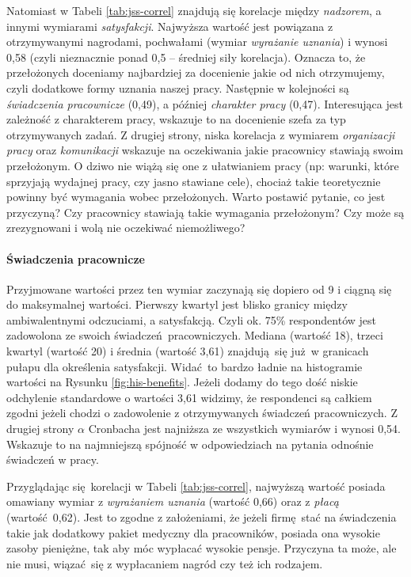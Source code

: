 Natomiast w Tabeli \ref{tab:jss-correl} znajdują się korelacje między \textit{nadzorem}, a innymi wymiarami \textit{satysfakcji}. Najwyższa wartość jest powiązana z otrzymywanymi nagrodami, pochwałami (wymiar \textit{wyrażanie uznania}) i wynosi 0,58 (czyli nieznacznie ponad 0,5 -- średniej siły korelacja). Oznacza to, że przełożonych doceniamy najbardziej za docenienie jakie od nich otrzymujemy, czyli dodatkowe formy uznania naszej pracy. Następnie w kolejności są
\textit{świadczenia pracownicze} (0,49), a
później \textit{charakter pracy} (0,47). Interesująca jest zależność z charakterem pracy, wskazuje to na docenienie szefa za typ otrzymywanych zadań. Z drugiej strony, niska korelacja z wymiarem \textit{organizacji pracy} oraz \textit{komunikacji} wskazuje na oczekiwania jakie pracownicy stawiają swoim przełożonym. O dziwo nie wiążą się one z ułatwianiem pracy (np: warunki, które sprzyjają wydajnej pracy, czy jasno stawiane cele), chociaż takie teoretycznie powinny być
wymagania wobec przełożonych. Warto postawić pytanie, co jest przyczyną? Czy pracownicy stawiają takie wymagania przełożonym? Czy może są zrezygnowani i wolą nie oczekiwać niemożliwego?

\paragraph{Świadczenia pracownicze}\label{par:res-benefits} Przyjmowane wartości przez ten wymiar zaczynają się dopiero od 9 i ciągną się do maksymalnej wartości. Pierwszy kwartyl jest blisko granicy między ambiwalentnymi odczuciami, a satysfakcją. Czyli ok. 75\% respondentów jest zadowolona ze swoich świadczeń pracowniczych. Mediana (wartość 18), trzeci kwartyl (wartość 20) i średnia (wartość 3,61) znajdują się już w granicach pułapu dla określenia satysfakcji. Widać to bardzo ładnie na histogramie wartości na
Rysunku \ref{fig:his-benefits}. Jeżeli dodamy do tego dość niskie
odchylenie standardowe o wartości 3,61 widzimy, że respondenci są całkiem zgodni jeżeli chodzi o zadowolenie z otrzymywanych świadczeń pracowniczych. Z drugiej strony $\alpha$ Cronbacha jest najniższa ze wszystkich wymiarów i wynosi 0,54. Wskazuje to na najmniejszą spójność w odpowiedziach na pytania odnośnie świadczeń w pracy.

Przyglądając się korelacji w Tabeli \ref{tab:jss-correl}, najwyższą wartość posiada omawiany wymiar z \textit{wyrażaniem uznania} (wartość 0,66) oraz z \textit{płacą} (wartość 0,62). Jest to zgodne z założeniami, że jeżeli firmę stać na świadczenia takie jak dodatkowy pakiet medyczny dla pracowników, posiada ona wysokie zasoby pieniężne, tak aby móc wypłacać wysokie pensje. Przyczyna ta może, ale nie musi, wiązać się z wypłacaniem nagród czy też ich rodzajem. 

